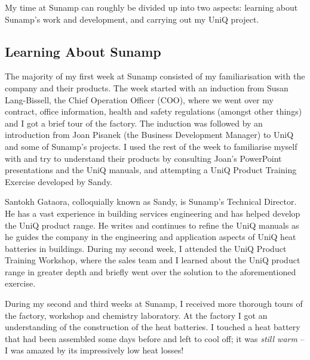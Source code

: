 My time at Sunamp can roughly be divided up into two aspects: learning about Sunamp's work and development, and
carrying out my UniQ project.





\subsection{Learning About Sunamp}

The majority of my first week at Sunamp consisted of my familiarisation with the company and their products.
The week started with an induction from Susan Lang-Bissell, the Chief Operation Officer (COO), where we went over my contract, office information, health and safety regulations (amongst other things) and I got a brief tour of the factory.
The induction was followed by an introduction from Joan Pisanek (the Business Development Manager) to UniQ and some of Sunamp's projects.
I used the rest of the week to familiarise myself with and try to understand their products by consulting Joan's PowerPoint presentations and the UniQ manuals,
and attempting a UniQ Product Training Exercise developed by Sandy.

Santokh Gataora, colloquially known as Sandy, is Sunamp's Technical Director.
He has a vast experience in building services engineering and has helped develop the UniQ product range.
He writes and continues to refine the UniQ manuals as he guides the company in the engineering and application aspects of UniQ heat batteries in buildings.
During my second week, I attended the UniQ Product Training Workshop, where the sales team and I learned about the UniQ product range in greater depth and briefly went over the solution to the aforementioned exercise.

During my second and third weeks at Sunamp, I received more thorough tours of the factory, workshop and chemistry laboratory.
At the factory I got an understanding of the construction of the heat batteries.
I touched a heat battery that had been assembled some days before and left to cool off; it was \emph{still warm} -- I was amazed by its impressively low heat losses!

